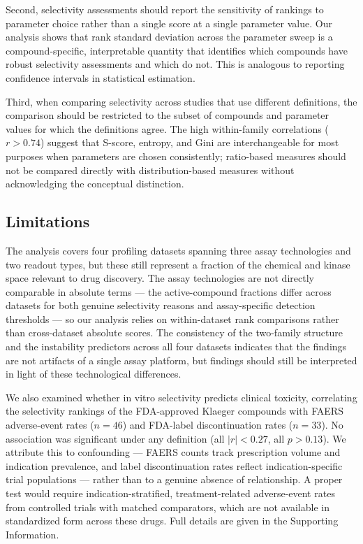 \documentclass[journal=jcisd8,manuscript=article]{achemso}
\begin{document}
Second, selectivity assessments should report the sensitivity of rankings to
parameter choice rather than a single score at a single parameter value.
Our analysis shows that rank standard deviation across the parameter sweep is a
compound-specific, interpretable quantity that identifies which compounds have
robust selectivity assessments and which do not.
This is analogous to reporting confidence intervals in statistical estimation.

Third, when comparing selectivity across studies that use different definitions,
the comparison should be restricted to the subset of compounds and parameter
values for which the definitions agree.
The high within-family correlations ($r > 0.74$) suggest that S-score, entropy,
and Gini are interchangeable for most purposes when parameters are chosen
consistently; ratio-based measures should not be compared directly with
distribution-based measures without acknowledging the conceptual distinction.

\subsection{Limitations}

The analysis covers four profiling datasets spanning three assay technologies
and two readout types, but these still represent a fraction of the chemical and
kinase space relevant to drug discovery.
The assay technologies are not directly comparable in absolute terms --- the
active-compound fractions differ across datasets for both genuine
selectivity reasons and assay-specific detection thresholds --- so our analysis
relies on within-dataset rank comparisons rather than cross-dataset absolute
scores.
The consistency of the two-family structure and the instability predictors
across all four datasets indicates that the findings are not artifacts of a
single assay platform, but findings should still be interpreted in light of
these technological differences.

We also examined whether in vitro selectivity predicts clinical toxicity,
correlating the selectivity rankings of the FDA-approved Klaeger compounds with
FAERS adverse-event rates ($n = 46$) and FDA-label discontinuation rates
($n = 33$).
No association was significant under any definition (all $|r| < 0.27$, all
$p > 0.13$).
We attribute this to confounding --- FAERS counts track prescription volume and
indication prevalence, and label discontinuation rates reflect
indication-specific trial populations --- rather than to a genuine absence of
relationship.
A proper test would require indication-stratified, treatment-related
adverse-event rates from controlled trials with matched comparators, which are
not available in standardized form across these drugs.
Full details are given in the Supporting Information.
\end{document}
